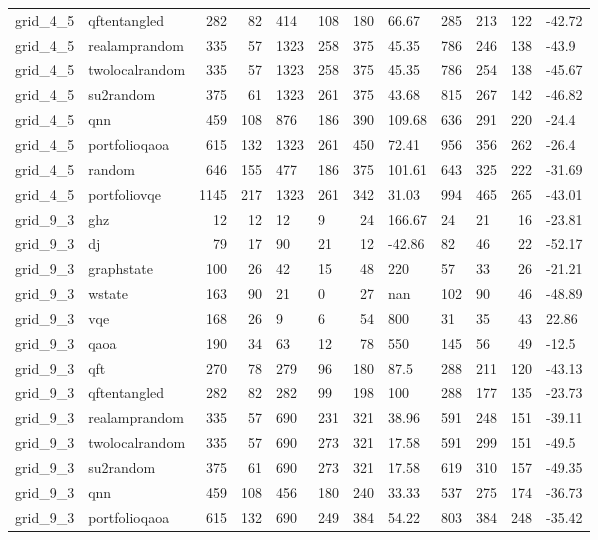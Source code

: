 \begin{longtable}{llrrllrlllrl}
grid\_4\_5 & qftentangled & 282 & 82 & 414 & 108 & 180 & 66.67 & 285 & 213 & 122 & -42.72 \\
grid\_4\_5 & realamprandom & 335 & 57 & 1323 & 258 & 375 & 45.35 & 786 & 246 & 138 & -43.9 \\
grid\_4\_5 & twolocalrandom & 335 & 57 & 1323 & 258 & 375 & 45.35 & 786 & 254 & 138 & -45.67 \\
grid\_4\_5 & su2random & 375 & 61 & 1323 & 261 & 375 & 43.68 & 815 & 267 & 142 & -46.82 \\
grid\_4\_5 & qnn & 459 & 108 & 876 & 186 & 390 & 109.68 & 636 & 291 & 220 & -24.4 \\
grid\_4\_5 & portfolioqaoa & 615 & 132 & 1323 & 261 & 450 & 72.41 & 956 & 356 & 262 & -26.4 \\
grid\_4\_5 & random & 646 & 155 & 477 & 186 & 375 & 101.61 & 643 & 325 & 222 & -31.69 \\
grid\_4\_5 & portfoliovqe & 1145 & 217 & 1323 & 261 & 342 & 31.03 & 994 & 465 & 265 & -43.01 \\
grid\_9\_3 & ghz & 12 & 12 & 12 & 9 & 24 & 166.67 & 24 & 21 & 16 & -23.81 \\
grid\_9\_3 & dj & 79 & 17 & 90 & 21 & 12 & -42.86 & 82 & 46 & 22 & -52.17 \\
grid\_9\_3 & graphstate & 100 & 26 & 42 & 15 & 48 & 220 & 57 & 33 & 26 & -21.21 \\
grid\_9\_3 & wstate & 163 & 90 & 21 & 0 & 27 & nan & 102 & 90 & 46 & -48.89 \\
grid\_9\_3 & vqe & 168 & 26 & 9 & 6 & 54 & 800 & 31 & 35 & 43 & 22.86 \\
grid\_9\_3 & qaoa & 190 & 34 & 63 & 12 & 78 & 550 & 145 & 56 & 49 & -12.5 \\
grid\_9\_3 & qft & 270 & 78 & 279 & 96 & 180 & 87.5 & 288 & 211 & 120 & -43.13 \\
grid\_9\_3 & qftentangled & 282 & 82 & 282 & 99 & 198 & 100 & 288 & 177 & 135 & -23.73 \\
grid\_9\_3 & realamprandom & 335 & 57 & 690 & 231 & 321 & 38.96 & 591 & 248 & 151 & -39.11 \\
grid\_9\_3 & twolocalrandom & 335 & 57 & 690 & 273 & 321 & 17.58 & 591 & 299 & 151 & -49.5 \\
grid\_9\_3 & su2random & 375 & 61 & 690 & 273 & 321 & 17.58 & 619 & 310 & 157 & -49.35 \\
grid\_9\_3 & qnn & 459 & 108 & 456 & 180 & 240 & 33.33 & 537 & 275 & 174 & -36.73 \\
grid\_9\_3 & portfolioqaoa & 615 & 132 & 690 & 249 & 384 & 54.22 & 803 & 384 & 248 & -35.42 \\

\end{longtable}

